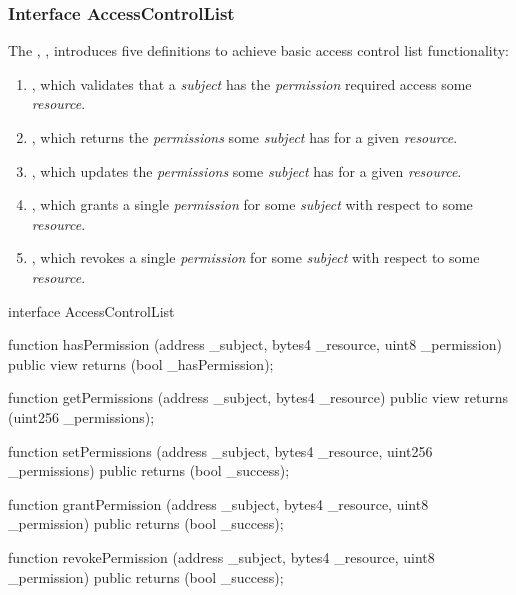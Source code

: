 \subsubsection{Interface AccessControlList}

The , , introduces five
 definitions to achieve basic access control list functionality:

\begin{enumerate}
  \item {}, which validates that a \emph{subject} has
    the \emph{permission} required access some \emph{resource}.

  \item {}, which returns the \emph{permissions} some
    \emph{subject} has for a given \emph{resource}.

  \item {}, which updates the \emph{permissions} some
    \emph{subject} has for a given \emph{resource}.

  \item {}, which grants a single \emph{permission}
    for some \emph{subject} with respect to some \emph{resource}.

  \item {}, which revokes a single
    \emph{permission} for some \emph{subject} with respect to some
    \emph{resource}.
\end{enumerate}

\begin{solidity}
interface AccessControlList {
  function hasPermission (address _subject, bytes4 _resource, uint8 _permission)
    public view returns (bool _hasPermission);

  function getPermissions (address _subject, bytes4 _resource)
    public view returns (uint256 _permissions);

  function setPermissions (address _subject, bytes4 _resource, uint256 _permissions)
    public returns (bool _success);

  function grantPermission (address _subject, bytes4 _resource, uint8 _permission)
    public returns (bool _success);

  function revokePermission (address _subject, bytes4 _resource, uint8 _permission)
    public returns (bool _success);
}
\end{solidity}

